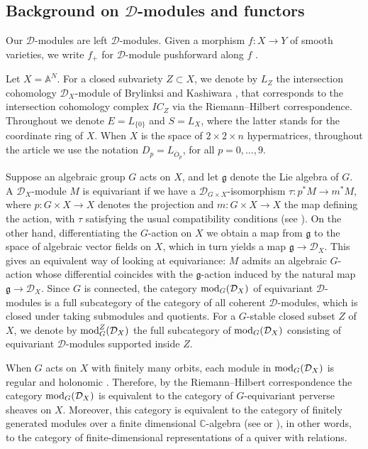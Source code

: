 \documentclass[11pt,reqno]{amsart}
\newcommand{\D}{\mathcal{D}}
\newcommand{\tn}{\textnormal}
\newcommand{\bb}[1]{\mathbb{#1}}
\newcommand{\mf}[1]{\mathfrak{#1}}
\newcommand{\ol}[1]{\overline{#1}}
\numberwithin{equation}{section}
\begin{document}
\subsection{Background on $\D$-modules and functors}\label{sec:Dmod} Our $\D$-modules are left $\D$-modules. Given a morphism $f:X\to Y$ of smooth varieties, we write $f_+$ for $\D$-module pushforward along $f$ \cite[Section 1.5]{htt}.

Let $X=\mathbb{A}^N$. For a closed subvariety $Z\subset X$, we denote by $L_Z$ the intersection cohomology $\D_X$-module of Brylinksi and Kashiwara \cite[Section 3.4]{htt}, that corresponds to the intersection cohomology complex $IC_Z$ via the Riemann--Hilbert correspondence. Throughout we denote $E=L_{\{0\}}$ and $S=L_X$, where the latter stands for the coordinate ring of $X$. When $X$ is the space of $2\times 2\times n$ hypermatrices, throughout the article we use the notation $D_p = L_{\ol{O}_p}$, for all $p=0,\dots, 9$.

\smallskip

Suppose an algebraic group $G$ acts on $X$, and let $\mf{g}$ denote the Lie algebra of $G$. A $\D_X$-module $M$ is equivariant if we have a $\D_{G\times X}$-isomorphism $\tau: p^*M \rightarrow m^*M$, where $p: G\times X\to X$ denotes the projection and $m: G\times X\to X$ the map defining the action, with $\tau$ satisfying the usual compatibility conditions (see \cite[Definition 11.5.2]{htt}). On the other hand, differentiating the $G$-action on $X$ we obtain a map from $\mf{g}$ to the space of algebraic vector fields on $X$, which in turn yields a map $\mf{g} \to \D_X$. This gives an equivalent way of looking at equivariance: $M$ admits an algebraic $G$-action whose differential coincides with the $\mf{g}$-action induced by the natural map $\mf{g} \to \D_X$. Since $G$ is connected, the category  $\tn{mod}_{G}(\D_X)$ of equivariant $\D$-modules is a full subcategory of the category of all coherent $\D$-modules, which is closed under taking submodules and quotients. For a $G$-stable closed subset $Z$ of $X$, we denote by $ \tn{mod}_{G}^Z(\D_X)$ the full subcategory of $\tn{mod}_{G}(\D_X)$ consisting of equivariant $\D$-modules supported inside $Z$.

When $G$ acts on $X$ with finitely many orbits, each module in  $\tn{mod}_{G}(\D_X)$ is regular and holonomic \cite[Theorem~11.6.1]{htt}. Therefore, by the Riemann--Hilbert correspondence the category $\tn{mod}_{G}(\D_X)$ is equivalent to the category of $G$-equivariant perverse sheaves on $X$. Moreover, this category is equivalent to the category of finitely generated modules over a finite dimensional $\bb{C}$-algebra (see \cite[Theorem 4.3]{vilonen} or  \cite[Theorem 3.4]{lHorincz2019categories}), in other words, to the category of finite-dimensional representations of a quiver with relations.
\end{document}
